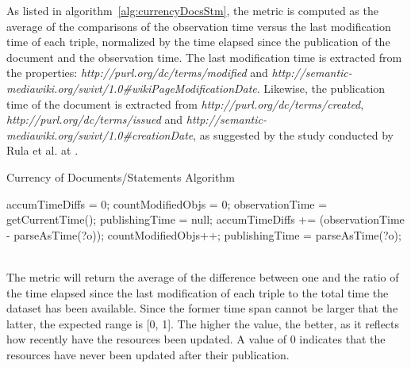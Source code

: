 As listed in algorithm~\ref{alg:currencyDocsStm}, the metric is computed as the average of the comparisons of the observation time versus the last modification time of each triple, normalized by the time elapsed since the publication of the document and the observation time. The last modification time is extracted from the properties: \textit{http://purl.org/dc/terms/modified} and \textit{http://semantic-mediawiki.org/swivt/1.0\#wikiPageModificationDate}. Likewise, the publication time of the document is extracted from \textit{http://purl.org/dc/terms/created}, \textit{http://purl.org/dc/terms/issued} and \textit{http://semantic-mediawiki.org/swivt/1.0\#creationDate}, as suggested by the study conducted by Rula et al. at \cite{Rula2012}.
\begin{algorithm}
\caption{Currency of Documents/Statements Algorithm} \label{alg:currencyDocsStm}
\begin{algorithmic}[1]
\State accumTimeDiffs = 0;
\State countModifiedObjs = 0;
\State observationTime = getCurrentTime();
\State publishingTime = null;
\EndProcedure
{}
\State accumTimeDiffs += (observationTime - parseAsTime(?o));
\State countModifiedObjs++;
\EndIf
{} 
\State publishingTime = parseAsTime(?o);
\EndIf ~\\
\EndProcedure
\end{algorithmic}
\end{algorithm}
The metric will return the average of the difference between one and the ratio of the time elapsed since the last modification of each triple to the total time the dataset has been available. Since the former time span cannot be larger that the latter, the expected range is [0, 1]. The higher the value, the better, as it reflects how recently have the resources been updated. A value of 0 indicates that the resources have never been updated after their publication.


